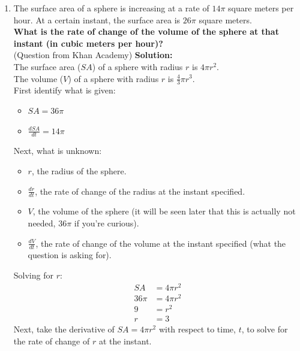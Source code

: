 \documentclass[12pt]{article}
\begin{document}
\begin{enumerate}
                \item The surface area of a sphere is increasing at a rate of $14 \pi$ square meters per hour. At a certain instant, the surface area is $26 \pi$ square meters.
                \\ \textbf{What is the rate of change of the volume of the sphere at that instant (in cubic meters per hour)?}
                \\ (Question from Khan Academy)
                \newline \newline
                \textbf{Solution:}
                \\ The surface area ($SA$) of a sphere with radius $r$ is $4 \pi r^2$.
                \\ The volume ($V$) of a sphere with radius $r$ is $\frac{4}{3} \pi r^3$.
                \\ First identify what is given:
                \begin{itemize}
                    \item $SA = 36 \pi$
                    \item $\frac{dSA}{dt} = 14 \pi$
                \end{itemize}
                Next, what is unknown:
                \begin{itemize}
                    \item $r$, the radius of the sphere.
                    \item $\frac{dr}{dt}$, the rate of change of the radius at the instant specified.
                    \item $V$, the volume of the sphere (it will be seen later that this is actually not needed, $36 \pi$ if you're curious).
                    \item $\frac{dV}{dt}$, the rate of change of the volume at the instant specified (what the question is asking for).
                \end{itemize}
                Solving for $r$:
                \begin{align*}
                    SA &= 4 \pi r^2 \\
                    36 \pi &= 4 \pi r^2 \\
                    9 &= r^2 \\
                    r &= 3
                \end{align*}
                Next, take the derivative of $SA = 4 \pi r^2$ with respect to time, $t$, to solve for the rate of change of $r$ at the instant.

\end{enumerate}
\end{document}
